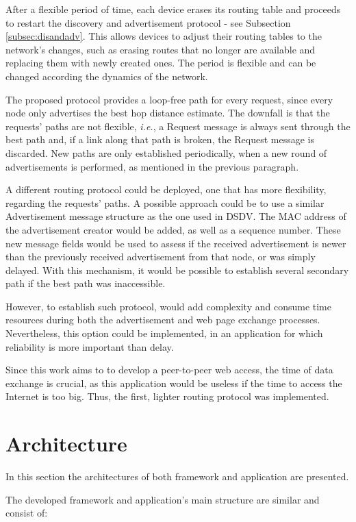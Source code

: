 After a flexible period of time, each device erases its routing table and proceeds to restart the discovery and advertisement protocol - see Subsection \ref{subsec:disandadv}. This allows devices to adjust their routing tables to the network's changes, such as erasing routes that no longer are available and replacing them with newly created ones. The period is flexible and can be changed according the dynamics of the network.

The proposed protocol provides a loop-free path for every request, since every node only advertises the best hop distance estimate. The downfall is that the requests' paths are not flexible, \textit{i.e.}, a Request message is always sent through the best path and, if a link along that path is broken, the Request message is discarded. New paths are only established periodically, when a new round of advertisements is performed, as mentioned in the previous paragraph.

A different routing protocol could be deployed, one that has more flexibility, regarding the requests' paths. A possible approach could be to use a similar Advertisement message structure as the one used in \gls{DSDV}. The \gls{MAC} address of the advertisement creator would be added, as well as a sequence number. These new message fields would be used to assess if the received advertisement is newer than the previously received advertisement from that node, or was simply delayed. With this mechanism, it would be possible to establish several secondary path if the best path was inaccessible.

However, to establish such protocol, would add complexity and consume time resources during both the advertisement and web page exchange processes. Nevertheless, this option could be implemented, in an application for which reliability is more important than delay.

Since this work aims to to develop a peer-to-peer web access, the time of data exchange is crucial, as this application would be useless if the time to access the Internet is too big. Thus, the first, lighter routing protocol was implemented.

\section{Architecture}
\label{sec:architecture}

In this section the architectures of both framework and application are presented.

The developed framework and application's main structure are similar and consist of:

